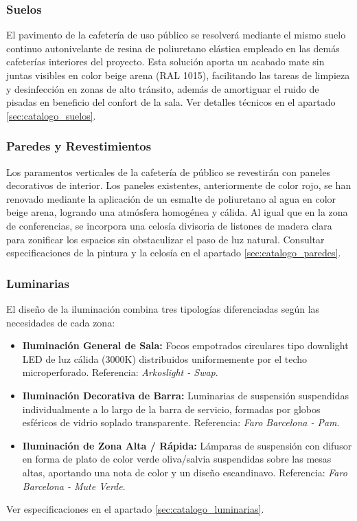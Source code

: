 \documentclass[12pt,a4paper]{article}
\begin{document}
\subsubsection{Suelos}
El pavimento de la cafetería de uso público se resolverá mediante el mismo suelo continuo autonivelante de resina de poliuretano elástica empleado en las demás cafeterías interiores del proyecto. Esta solución aporta un acabado mate sin juntas visibles en color beige arena (RAL 1015), facilitando las tareas de limpieza y desinfección en zonas de alto tránsito, además de amortiguar el ruido de pisadas en beneficio del confort de la sala. Ver detalles técnicos en el apartado \ref{sec:catalogo_suelos}.

\subsubsection{Paredes y Revestimientos}
Los paramentos verticales de la cafetería de público se revestirán con paneles decorativos de interior. Los paneles existentes, anteriormente de color rojo, se han renovado mediante la aplicación de un esmalte de poliuretano al agua en color beige arena, logrando una atmósfera homogénea y cálida. Al igual que en la zona de conferencias, se incorpora una celosía divisoria de listones de madera clara para zonificar los espacios sin obstaculizar el paso de luz natural. Consultar especificaciones de la pintura y la celosía en el apartado \ref{sec:catalogo_paredes}.

\subsubsection{Luminarias}
El diseño de la iluminación combina tres tipologías diferenciadas según las necesidades de cada zona:
\begin{itemize}
    \item \textbf{Iluminación General de Sala:} Focos empotrados circulares tipo downlight LED de luz cálida (3000K) distribuidos uniformemente por el techo microperforado. Referencia: \textit{Arkoslight - Swap}.
    \item \textbf{Iluminación Decorativa de Barra:} Luminarias de suspensión suspendidas individualmente a lo largo de la barra de servicio, formadas por globos esféricos de vidrio soplado transparente. Referencia: \textit{Faro Barcelona - Pam}.
    \item \textbf{Iluminación de Zona Alta / Rápida:} Lámparas de suspensión con difusor en forma de plato de color verde oliva/salvia suspendidas sobre las mesas altas, aportando una nota de color y un diseño escandinavo. Referencia: \textit{Faro Barcelona - Mute Verde}.
\end{itemize}
Ver especificaciones en el apartado \ref{sec:catalogo_luminarias}.
\end{document}
